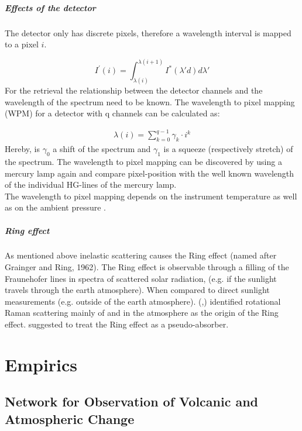 \documentclass  [
  paper    = a4,
  BCOR     = 10mm,
  twoside,
  fontsize = 12pt,
  fleqn,
  toc      = bibnumbered,
  toc      = listofnumbered,
  numbers  = noendperiod,
  headings = normal,
  listof   = leveldown,
  version  = 3.03
]                                       {scrreprt}
\begin{document}
	\subsubsection*{Effects of the detector}
	The detector only has discrete pixels, therefore a wavelength interval is mapped to a pixel $i$.
	
	\begin{equation}
	I^{'}\left(i\right) = \int_{\lambda(i)}^{\lambda(i+1)}I^{*}\left(\lambda{'}d\right)d\lambda{'}
	\end{equation}
	For the retrieval the relationship between the detector channels and the wavelength of the spectrum need to be known.
	The wavelength to pixel mapping (WPM) for a detector with q channels can be calculated as:

	\begin{eqnarray}
	\lambda(i) = \sum_{k=0}^{q-1}\gamma_{k}\cdot i^{k}
	\end{eqnarray}
	Hereby, is $\gamma_{0}$ a shift of the spectrum and $\gamma_{1}$ is a squeeze (respectively stretch) of the spectrum.
	The wavelength to pixel mapping can be discovered by using a mercury lamp again and compare pixel-position with the well known wavelength of the individual HG-lines of the mercury lamp.\\
	The wavelength to pixel mapping depends on the instrument temperature as well as on the ambient pressure \citep{lubcke2014bro}.
	\subsubsection*{Ring effect}
	As mentioned above inelastic scattering causes the Ring effect (named after Grainger and Ring, 1962).
	The Ring effect is observable through a filling of the Fraunehofer lines in spectra of scattered solar radiation, (e.g. if the sunlight travels through the earth atmosphere). When compared to direct sunlight measurements (e.g. outside of the earth atmosphere).
	(\citet{bussemer1993ring},\citet{solomon1987interpretation}) identified rotational Raman scattering mainly of
	 and  in the atmosphere as the origin of the Ring effect.
	\citet{solomon1987interpretation} suggested to treat the Ring effect as a pseudo-absorber. 


	
	\part{Empirics}
	
	
	\chapter{Network for Observation of Volcanic and Atmospheric Change \label{NOVAC}}
\end{document}
